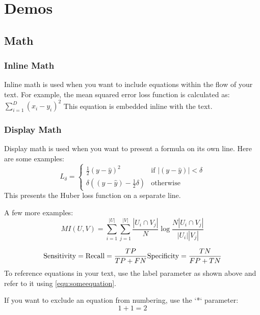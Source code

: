 \chapter{Demos}
\section{Math}
\subsection{Inline Math}

Inline math is used when you want to include equations within the flow of your text. For example, the mean squared error loss function is calculated as:
\begin{math}
\sum_{i=1}^{D}(x_i-y_i)^2
\end{math}
This equation is embedded inline with the text.

\subsection{Display Math}
Display math is used when you want to present a formula on its own line. Here are some examples:
\begin{equation}
L_{\delta} =
    \left\{
    \begin{matrix}
        \frac{1}{2}(y - \hat{y})^{2} & \text{if } \left | (y - \hat{y}) \right | < \delta \\
        \delta ((y - \hat{y}) - \frac{1}{2} \delta) & \text{otherwise}
    \end{matrix}
    \right.
\end{equation}
This presents the Huber loss function on a separate line.

A few more examples:
\begin{equation}
    MI(U,V) = \sum_{i=1}^{|U|} \sum_{j=1}^{|V|} \frac{|U_i \cap V_j|}{N}
\log\frac{N|U_i \cap V_j|}{|U_i||V_j|}
\end{equation}

\begin{equation}\label{equ:someequation}
    \text{Sensitivity} = \text{Recall} = \frac{TP}{TP + FN} \\
    \text{Specificity} = \frac{TN}{FP + TN}
\end{equation}
To reference equations in your text, use the label parameter as shown above and refer to it using \ref{equ:someequation}.

If you want to exclude an equation from numbering, use the `*` parameter:
\begin{equation*}
    1 + 1 = 2
\end{equation*}

